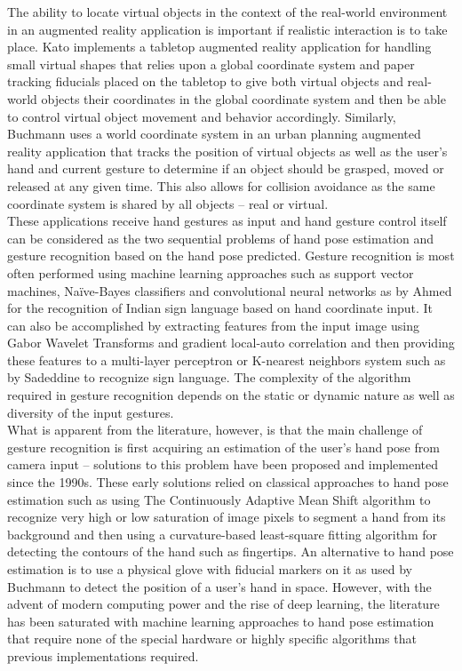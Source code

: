 The ability to locate virtual objects in the context of the real-world environment in an augmented reality application is important if realistic interaction is to take place. Kato \cite{ar_tabletop} implements a tabletop augmented reality application for handling small virtual shapes that relies upon a global coordinate system and paper tracking fiducials placed on the tabletop to give both virtual objects and real-world objects their coordinates in the global coordinate system and then be able to control virtual object movement and behavior accordingly. Similarly, Buchmann \cite{fingartips} uses a world coordinate system in an urban planning augmented reality application that tracks the position of virtual objects as well as the user’s hand and current gesture to determine if an object should be grasped, moved or released at any given time. This also allows for collision avoidance as the same coordinate system is shared by all objects – real or virtual. \\

These applications receive hand gestures as input and hand gesture control itself can be considered as the two sequential problems of hand pose estimation and gesture recognition based on the hand pose predicted. Gesture recognition is most often performed using machine learning approaches such as support vector machines, Naïve-Bayes classifiers and convolutional neural networks as by Ahmed \cite{indian_sign_language} for the recognition of Indian sign language based on hand coordinate input. It can also be accomplished by extracting features from the input image using Gabor Wavelet Transforms and gradient local-auto correlation and then providing these features to a multi-layer perceptron or K-nearest neighbors system such as by Sadeddine \cite{combined_sign_language} to recognize sign language. The complexity of the algorithm required in gesture recognition depends on the static or dynamic nature as well as diversity of the input gestures. \\

What is apparent from the literature, however, is that the main challenge of gesture recognition is first acquiring an estimation of the user’s hand pose from camera input – solutions to this problem have been proposed and implemented since the 1990s. These early solutions \cite{hand_classical_approach} relied on classical approaches to hand pose estimation such as using The Continuously Adaptive Mean Shift algorithm to recognize very high or low saturation of image pixels to segment a hand from its background and then using a curvature-based least-square fitting algorithm for detecting the contours of the hand such as fingertips. An alternative to hand pose estimation is to use a physical glove with fiducial markers on it as used by Buchmann \cite{fingartips} to detect the position of a user’s hand in space. However, with the advent of modern computing power and the rise of deep learning, the literature has been saturated with machine learning approaches to hand pose estimation that require none of the special hardware or highly specific algorithms that previous implementations required.  \\

